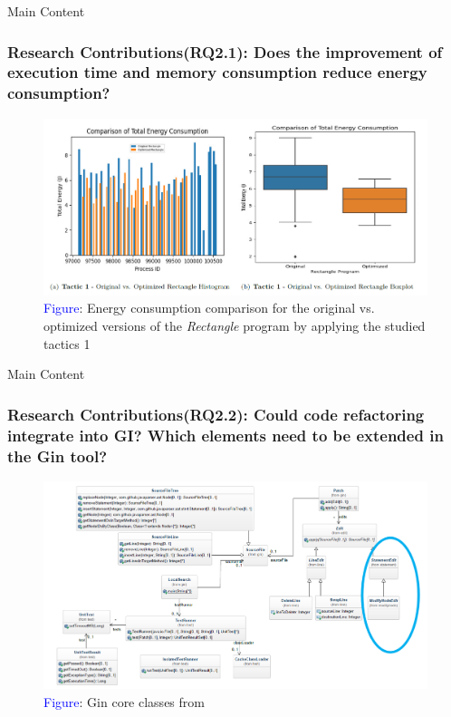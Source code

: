 \documentclass{beamer}
\begin{document}
\begin{frame}{Main Content}
  \frametitle{Research Contributions(RQ2.1): Does the improvement of execution time and memory consumption reduce energy consumption?}

  \begin{figure}
    \centering
    \includegraphics[width=1\textwidth]{figures/Hiegest_Rectangle.png}
    \caption*{\scriptsize{\textcolor{blue}{Figure}: Energy consumption comparison for the original vs. optimized versions of the \textit{Rectangle} program by applying the studied tactics 1}}
 \end{figure}
 
\end{frame}

\begin{frame}{Main Content}
  \frametitle{Research Contributions(RQ2.2): Could code refactoring integrate into GI? Which elements need to be extended in the Gin tool?}
  
   \begin{figure}
    \centering
    \includegraphics[width=.9\textwidth]{figures/Slide_17(Gin class diagram).png}
    \captionsetup{justification=centering} %
    \caption*{\scriptsize{\textcolor{blue}{Figure}: Gin core classes from \cite{brownlee2019gin}}}
  \end{figure}
  
\end{frame}
\end{document}
